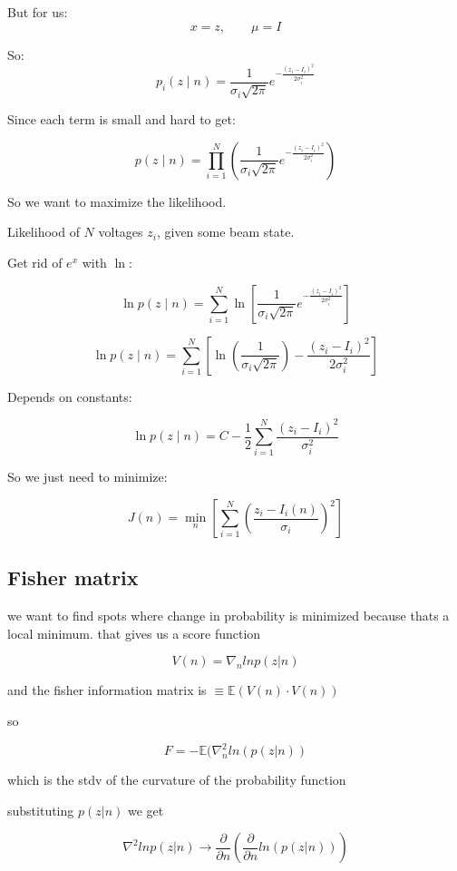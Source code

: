 \documentclass[12pt]{article}
\begin{document}
But for us:
\[
x=z,
\qquad
\mu = I
\]

So:
\[
p_i(z\mid n)
=
\frac{1}{\sigma_i\sqrt{2\pi}}
e^{-\frac{(z_i-I_i)^2}{2\sigma_i^2}}
\]

Since each term is small and hard to get:

\[
p(z\mid n)
=
\prod_{i=1}^{N}
\left(
\frac{1}{\sigma_i\sqrt{2\pi}}
e^{-\frac{(z_i-I_i)^2}{2\sigma_i^2}}
\right)
\]

So we want to maximize the likelihood.

Likelihood of \(N\) voltages \(z_i\), given some beam state.

Get rid of \(e^x\) with \(\ln\):

\[
\ln p(z\mid n)
=
\sum_{i=1}^{N}
\ln\left[
\frac{1}{\sigma_i\sqrt{2\pi}}
e^{-\frac{(z_i-I_i)^2}{2\sigma_i^2}}
\right]
\]

\[
\ln p(z\mid n)
=
\sum_{i=1}^{N}
\left[
\ln\left(\frac{1}{\sigma_i\sqrt{2\pi}}\right)
-
\frac{(z_i-I_i)^2}{2\sigma_i^2}
\right]
\]

Depends on constants:

\[
\ln p(z\mid n)
=
C
-
\frac{1}{2}
\sum_{i=1}^{N}
\frac{(z_i-I_i)^2}{\sigma_i^2}
\]

So we just need to minimize:

\[
J(n)
=
\min_n
\left[
\sum_{i=1}^{N}
\left(
\frac{z_i-I_i(n)}{\sigma_i}
\right)^2
\right]
\]

\subsection{Fisher matrix}

we want to find spots where change in probability is minimized because thats a local minimum. that gives us a score function

\begin{equation}
    V(n) = \nabla_n ln p(z|n)
\end{equation}

and the fisher information matrix is $\equiv \mathbb{E}(V(n) \cdot V(n))$

so 

\begin{equation}
    F = -\mathbb{E}(\nabla_n^2 ln(p(z|n))
\end{equation}

which is the stdv of the curvature of the probability function

substituting $p(z|n)$ we get 

\begin{equation}
    \nabla^2 lnp(z|n) \rightarrow 
    \frac{\partial}{\partial n} \left( \frac{\partial}{\partial n} ln(p(z|n)) \right)
\end{equation}
\end{document}
